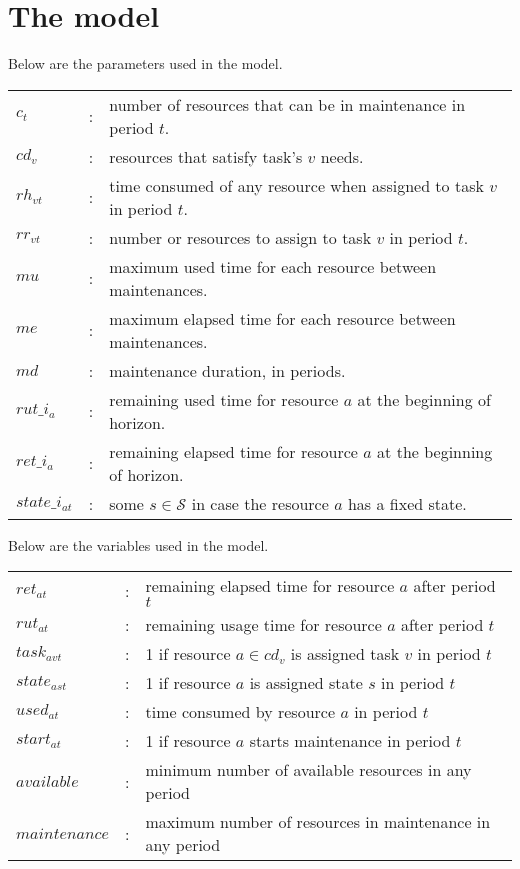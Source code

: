 \documentclass{roadef}
\begin{document}
\section{The model}

    Below are the parameters used in the model.

    \begin{tabular}{p{10mm}lp{110mm}}
    $c_t$                 & : & number of resources that can be in maintenance in period $t$. \\
    $cd_v$                & : & resources that satisfy task's $v$ needs. \\
    $rh_{vt}$           & : & time consumed of any resource when assigned to task $v$ in period $t$. \\
    $rr_{vt}$           & : & number or resources to assign to task $v$ in period $t$. \\            
    $mu$            & : & maximum used time for each resource between maintenances. \\    
    $me$          & : & maximum elapsed time for each resource between maintenances. \\    
    $md$           & : & maintenance duration, in periods. \\        
    $rut\_i_a$            & : & remaining used time for resource $a$ at the beginning of horizon. \\        
    $ret\_i_a$            & : & remaining elapsed time for resource $a$ at the beginning of horizon. \\
    $state\_i_{at}$       & : & some $s \in \mathcal{S}$ in case the resource $a$ has a fixed state. \\
    \end{tabular}
    \bigskip

    Below are the variables used in the model.

    \begin{tabular}{p{20mm}lp{100mm}}
        $ret_{at}$      & : & remaining elapsed time for resource $a$ after period $t$ \\  
        $rut_{at}$      & : & remaining usage time for resource $a$ after period $t$ \\  
        $task_{avt}$    & : & 1 if resource $a \in cd_v$ is assigned task $v$ in period $t$ \\  
        $state_{ast}$   & : & 1 if resource $a$ is assigned state $s$ in period $t$ \\  
        $used_{at}$     & : & time consumed by resource $a$ in period $t$ \\
        $start_{at}$    & : & 1 if resource $a$ starts maintenance in period $t$ \\
        $available$     & : & minimum number of available resources in any period \\
        $maintenance$   & : & maximum number of resources in maintenance in any period \\
    \end{tabular}
    \bigskip
\end{document}
